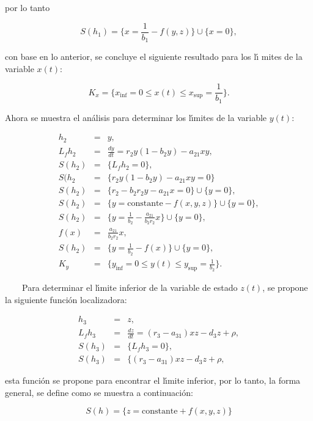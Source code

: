 \documentclass[letterpaper,11pt]{article}
\begin{document}
por lo tanto

\begin{equation*}
S(h_{1})=\{x=\frac{1}{b_{1}}-f(y,z)\}\cup \{x=0\},
\end{equation*}

con base en lo anterior, se concluye el siguiente resultado para los l\'{\i}%
mites de la variable $x(t):$

\begin{equation*}
K_{x}=\{x_{\inf }=0\leq x(t)\leq x_{\sup }=\frac{1}{b_{1}}\}.
\end{equation*}

\qquad Ahora se muestra el an\'{a}lisis para determinar los l\'{\i}mites de
la variable $y(t):$

\begin{eqnarray*}
h_{2} &=&y, \\
L_{f}h_{2} &=&\frac{dy}{dt}=r_{2}y(1-b_{2}y)-a_{21}xy, \\
S(h_{2}) &=&\{L_{f}h_{2}=0\}, \\
S(h_{2} &=&\{r_{2}y(1-b_{2}y)-a_{21}xy=0\} \\
S(h_{2}) &=&\{r_{2}-b_{2}r_{2}y-a_{21}x=0\}\cup \{y=0\}, \\
S(h_{2}) &=&\{y=\text{constante}-f(x,y,z)\}\cup \{y=0\}, \\
S(h_{2}) &=&\{y=\frac{1}{b_{2}}-\frac{a_{21}}{b_{2}r_{2}}x\}\cup \{y=0\}, \\
f(x) &=&\frac{a_{21}}{b_{2}r_{2}}x, \\
S(h_{2}) &=&\{y=\frac{1}{b_{2}}-f(x)\}\cup \{y=0\}, \\
K_{y} &=&\{y_{\inf }=0\leq y(t)\leq y_{\sup }=\frac{1}{b_{2}}\}.
\end{eqnarray*}

$\qquad $Para determinar el l\'{\i}mite inferior de la variable de estado $%
z(t)$, se propone la siguiente funci\'{o}n localizadora:

\begin{eqnarray*}
h_{3} &=&z, \\
L_{f}h_{3} &=&\frac{dz}{dt}=(r_{3}-a_{31})xz-d_{3}z+\rho , \\
S(h_{3}) &=&\{L_{f}h_{3}=0\}, \\
S(h_{3}) &=&\{(r_{3}-a_{31})xz-d_{3}z+\rho ,
\end{eqnarray*}

esta funci\'{o}n se propone para encontrar el l\'{\i}mite inferior, por lo
tanto, la forma general, se define como se muestra a continuaci\'{o}n:

\begin{equation*}
S(h)=\{z=\text{constante}+f(x,y,z)\}
\end{equation*}
\end{document}
